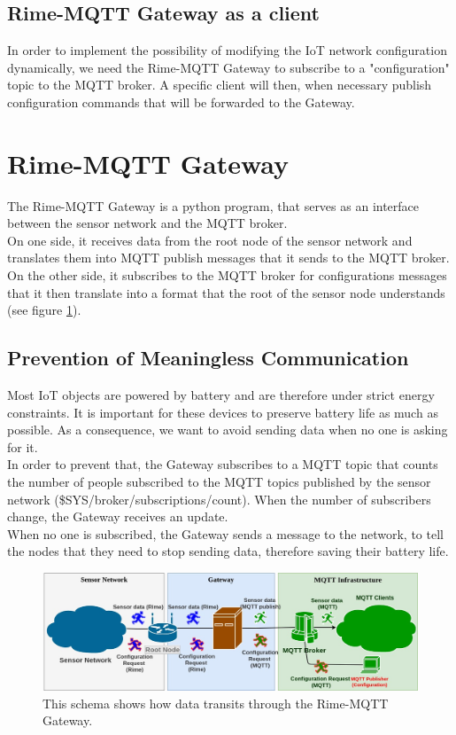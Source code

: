 \documentclass[a4paper,11pt]{article}
\begin{document}
\subsection{Rime-MQTT Gateway as a client}
In order to implement the possibility of modifying the IoT network configuration dynamically, we need the Rime-MQTT Gateway to subscribe to a "configuration" topic to the MQTT broker. A specific client will then, when necessary publish configuration commands that will be forwarded to the Gateway.


\section{Rime-MQTT Gateway}
The Rime-MQTT Gateway is a python program, that serves as an interface between the sensor network and the MQTT broker.\\

On one side, it receives data from the root node of the sensor network and translates them into MQTT publish messages that it sends to the MQTT broker. On the other side, it subscribes to the MQTT broker for configurations messages that it then translate into a format that the root of the sensor node understands (see figure \ref{fig:communication1}).\\


\subsection{Prevention of Meaningless Communication}
Most IoT objects are powered by battery and are therefore under strict energy constraints. It is important for these devices to preserve battery life as much as possible. As a consequence, we want to avoid sending data when no one is asking for it.\\

In order to prevent that, the Gateway subscribes to a MQTT topic that counts the number of people subscribed to the MQTT topics published by the sensor network (\$SYS/broker/subscriptions/count). When the number of subscribers change, the Gateway receives an update.\\

When no one is subscribed, the Gateway sends a message to the network, to tell the nodes that they need to stop sending data, therefore saving their battery life.

\begin{figure}
  \includegraphics[width=\linewidth]{img/communication-2.jpg}
  \caption{This schema shows how data transits through the Rime-MQTT Gateway.}
  \label{fig:communication1}
\end{figure}
\end{document}
